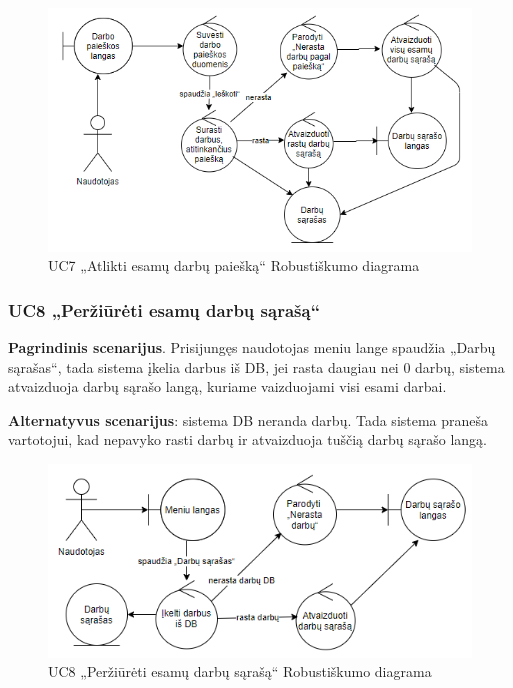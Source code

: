 \documentclass{VUMIFPSbakalaurinis}
\begin{document}
\begin{figure}[H]
	\centering
	\includegraphics[scale=0.6]{img/Robustness/UC7}
	\caption{UC7 „Atlikti esamų darbų paiešką“ Robustiškumo diagrama}
	\label{img:uc7rob}
\end{figure}

\subsubsection{UC8 „Peržiūrėti esamų darbų sąrašą“}
\textbf{Pagrindinis scenarijus}. Prisijungęs naudotojas meniu lange spaudžia „Darbų sąrašas“, tada sistema įkelia darbus iš DB, jei rasta daugiau nei 0 darbų, sistema atvaizduoja darbų sąrašo langą, kuriame vaizduojami visi esami darbai.
\par \textbf{Alternatyvus scenarijus}: sistema DB neranda darbų. Tada sistema praneša vartotojui, kad nepavyko rasti darbų ir atvaizduoja tuščią darbų sąrašo langą.

\begin{figure}[H]
	\centering
	\includegraphics[scale=0.6]{img/Robustness/UC8}
	\caption{UC8 „Peržiūrėti esamų darbų sąrašą“ Robustiškumo diagrama}
	\label{img:uc8rob}
\end{figure}
\end{document}
